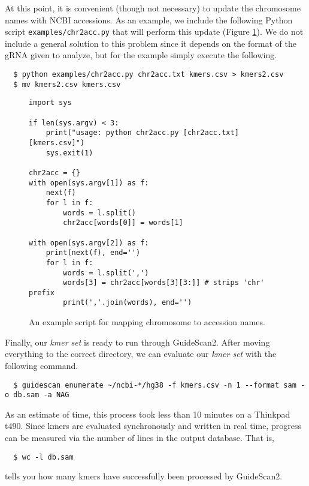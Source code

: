 \documentclass[10pt]{article}
\begin{document}
At this point, it is convenient (though not necessary) to update the
chromosome names with NCBI accessions. As an example, we include the
following Python script \texttt{examples/chr2acc.py} that will perform
this update (Figure \ref{fig:chr2accpy}). We do not include a general
solution to this problem since it depends on the format of the gRNA
given to analyze, but for the example simply execute the following.

\begin{verbatim}
  $ python examples/chr2acc.py chr2acc.txt kmers.csv > kmers2.csv
  $ mv kmers2.csv kmers.csv
\end{verbatim}

\begin{figure}[ht]
  \centering
  \begin{verbatim}
import sys

if len(sys.argv) < 3:
    print("usage: python chr2acc.py [chr2acc.txt] [kmers.csv]")
    sys.exit(1)

chr2acc = {}
with open(sys.argv[1]) as f:
    next(f)
    for l in f:
        words = l.split() 
        chr2acc[words[0]] = words[1]

with open(sys.argv[2]) as f:
    print(next(f), end='')
    for l in f:
        words = l.split(',')
        words[3] = chr2acc[words[3][3:]] # strips 'chr' prefix
        print(','.join(words), end='')
  \end{verbatim}
  \caption{\label{fig:chr2accpy} An example script for mapping
    chromosome to accession names.}
\end{figure}

Finally, our {\it kmer set} is ready to run through GuideScan2. After
moving everything to the correct directory, we can evaluate our {\it
  kmer set} with the following command.  \vspace{-0.8em}
\begin{verbatim}
  $ guidescan enumerate ~/ncbi-*/hg38 -f kmers.csv -n 1 --format sam -o db.sam -a NAG
\end{verbatim}
As an estimate of time, this process took less than 10 minutes on a
Thinkpad t490. Since kmers are evaluated synchronously and written in
real time, progress can be measured via the number of lines in the
output database. That is,
\vspace{-0.8em}
\begin{verbatim}
  $ wc -l db.sam
\end{verbatim}
tells you how many kmers have successfully been processed by GuideScan2.
\end{document}
